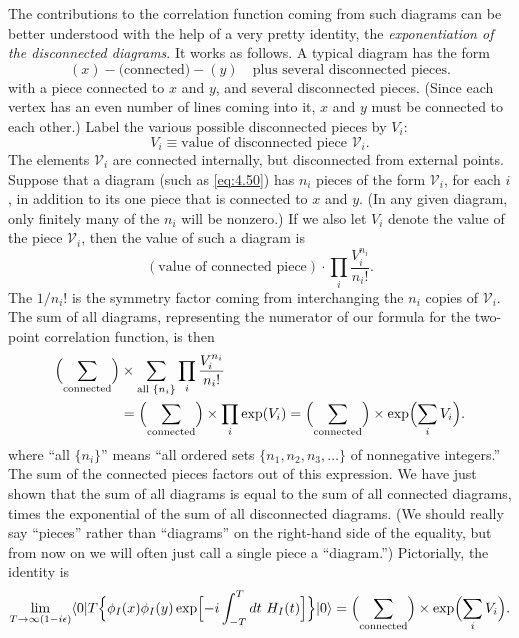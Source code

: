 The contributions to the correlation function coming from such diagrams can
be better understood with the help of a very pretty identity, the
\emph{exponentiation of the disconnected diagrams}.  It works as follows.  A
typical diagram has the form
\begin{equation}
  (x)\!-\!\text{(connected)}\!-\!(y) \quad\text{plus several disconnected
    pieces} .
  \label{eq:4.50}
\end{equation}
with a piece connected to $x$ and $y$, and several disconnected pieces.
(Since each vertex has an even number of lines coming into it, $x$ and $y$
must be connected to each other.)  Label the various possible disconnected
pieces by $V_i$:
\begin{equation}
  V_i \equiv \text{value of disconnected piece } \mathcal{V}_i .
  \label{eq:4.51}
\end{equation}
The elements $\mathcal{V}_i$ are connected internally, but disconnected from
external points.  Suppose that a diagram (such as \eqref{eq:4.50}) has $n_i$
pieces of the form $\mathcal{V}_i$, for each $i$, in addition to its one
piece that is connected to $x$ and $y$.  (In any given diagram, only finitely
many of the $n_i$ will be nonzero.)  If we also let $V_i$ denote the value of
the piece $\mathcal{V}_i$, then the value of such a diagram is
\begin{equation}
  (\text{value of connected piece}) \cdot \prod_i \frac{V_i^{n_i}}{n_i!} .
\end{equation}
The $1/n_i!$ is the symmetry factor coming from interchanging the $n_i$ copies
of $\mathcal{V}_i$.  The sum of all diagrams, representing the numerator of
our formula for the two-point correlation function, is then
\begin{equation}
  \begin{aligned}
    \Bigl( \sum_{\text{connected}} \Bigr)
      &\times \sum_{\text{all } \{n_i\}} \prod_i \frac{V_i^{n_i}}{n_i!}\\
    &= \Bigl( \sum_{\text{connected}} \Bigr)
      \times \prod_i \exp(V_i)
    = \Bigl( \sum_{\text{connected}} \Bigr)
      \times \exp\Bigl( \sum_i V_i \Bigr) .
  \end{aligned}
  \label{eq:4.52}
\end{equation}
where ``all $\{n_i\}$'' means ``all ordered sets $\{n_1, n_2, n_3, \ldots\}$
of nonnegative integers.''  The sum of the connected pieces factors out of
this expression.  We have just shown that the sum of all diagrams is equal to
the sum of all connected diagrams, times the exponential of the sum of all
disconnected diagrams.  (We should really say ``pieces'' rather than
``diagrams'' on the right-hand side of the equality, but from now on we will
often just call a single piece a ``diagram.'')  Pictorially, the identity is
\begin{equation}
  \lim_{T\to\infty(1-i\epsilon)}
    \langle 0|T\Bigl\{ \phi_I(x)\phi_I(y)\exp\Bigl[ -i\int_{-T}^{T}dt\ H_I(t)
      \Bigr]\Bigr\}|0\rangle
  = \Bigl( \sum_{\text{connected}} \Bigr)\times
    \exp\Bigl( \sum_i V_i \Bigr) .
  \label{eq:4.53}
\end{equation}


